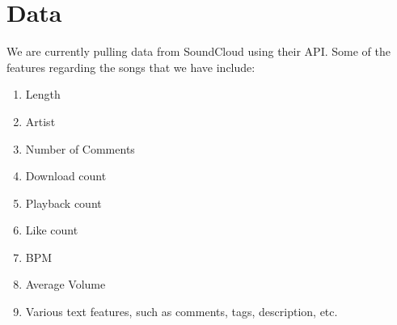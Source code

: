 \documentclass[12pt]{article}
\begin{document}
\section*{Data}

We are currently pulling data from SoundCloud using their API. Some of the features regarding the songs that we have include:
\begin{enumerate}
  \item Length
  \item Artist
  \item Number of Comments
  \item Download count
  \item Playback count
  \item Like count
  \item BPM
  \item Average Volume
  \item Various text features, such as comments, tags, description, etc.
\end{enumerate}
\end{document}
